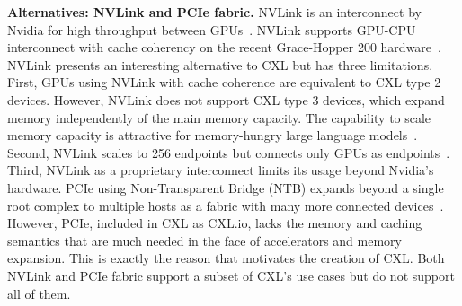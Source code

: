 \noindent \textbf{Alternatives: NVLink and PCIe fabric.}
%
% 
NVLink is an interconnect by Nvidia for high throughput between GPUs~\cite{nvlink}. NVLink supports GPU-CPU interconnect with cache coherency on the recent Grace-Hopper 200 hardware~\cite{dgx-gh200}. 
%
NVLink presents an interesting alternative to CXL but has three limitations. 
%
First, GPUs using NVLink with cache coherence are equivalent to CXL type 2 devices. 
%
However, NVLink does not support CXL type 3 devices, which expand memory independently of the main memory capacity.
%
The capability to scale memory capacity is attractive for memory-hungry large language models~\cite{gpt3:neurips:2020,llama:arxiv:2023}. 
%
Second, NVLink scales to 256 endpoints but connects only GPUs as endpoints~\cite{dgx-superpod}. 
Third, NVLink as a proprietary interconnect limits its usage beyond Nvidia's hardware.
%
PCIe using Non-Transparent Bridge (NTB) expands beyond a single root complex to multiple hosts as a fabric with many more connected devices~\cite{pcie-spec}. 
%
%
%
However, PCIe, included in CXL as CXL.io, lacks the memory and caching semantics that are much needed in the face of accelerators and memory expansion. 
%
This is exactly the reason that motivates the creation of CXL.
%
Both NVLink and PCIe fabric support a subset of CXL's use cases but do not support all of them.
%

